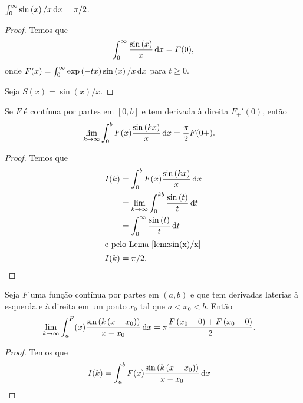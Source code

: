 \begin{lem} \label{lem:sin(x)/x}
    $\int_0^\infty \sin\left( x \right) / x \, \mathrm{d}x = \pi / 2$.
\end{lem}
\begin{proof}
    Temos que
    \begin{align*}
        \int_0^\infty \frac{\sin\left( x \right)}{x} \, \mathrm{d}x = F(0),
    \end{align*}
    onde $F(x) = \int_0^\infty \exp\left( -t x \right) \sin\left( x \right) / x \, \mathrm{d}x$ para $t \geq 0$.

    Seja $S(x) = \sin\left( x \right) / x$.
\end{proof}

\begin{lem} \label{lem:F_+'(x)}
    Se $F$ \'{e} cont\'{i}nua por partes em $[0,b]$ e tem derivada \`{a} direita $F_+'(0)$, ent\~{a}o
    \begin{align*}
        \lim_{k \to \infty} \int_0^b F(x) \frac{\sin\left( k x \right)}{x} \, \mathrm{d}x &= \frac{\pi}{2} F(0+).
    \end{align*}
\end{lem}
\begin{proof}
    Temos que
    \begin{align*}
        I(k) &= \int_0^b F(x) \frac{\sin\left( k x \right)}{x} \, \mathrm{d}x \\
        &= \lim_{k \to \infty} \int_0^{k b} \frac{\sin\left( t \right)}{t} \, \mathrm{d}t \\
        &= \int_0^\infty \frac{\sin\left( t \right)}{t} \, \mathrm{d}t \\
        \intertext{e pelo Lema~\ref{lem:sin(x)/x}}
        I(k) &= \pi / 2.
    \end{align*}
\end{proof}

\begin{lem} \label{lem:lim_int}
    Seja $F$ uma fun\c{c}\~{a}o cont\'{i}nua por partes em $(a,b)$ e que tem derivadas laterias \`{a} esquerda e \`{a} direita em um ponto $x_0$ tal que $a < x_0 < b$. Ent\~{a}o
    \begin{align*}
        \lim_{k \to \infty} \int_a^ F(x) \frac{\sin\left( k \left( x - x_0 \right) \right)}{x - x_0} \, \mathrm{d}x &= \pi \frac{F\left( x_0 + 0 \right) + F\left( x_0 - 0 \right)}{2}.
    \end{align*}
\end{lem}
\begin{proof}
    Temos que
    \begin{align*}
        I(k) &= \int_a^b F(x) \frac{\sin\left( k \left( x - x_0 \right) \right)}{x - x_0} \, \mathrm{d}x
    \end{align*}
\end{proof}

